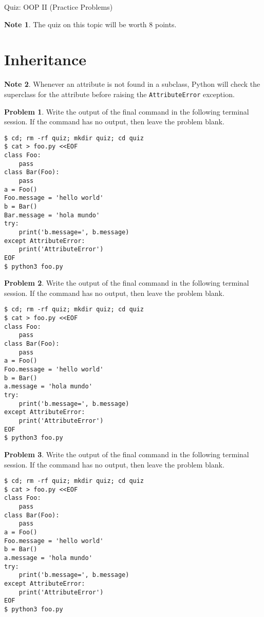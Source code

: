 \documentclass[10pt]{article}
\theoremstyle{definition}
\newtheorem{problem}{Problem}
\newtheorem{note}{Note}
\begin{document}
\begin{center}
    {
\Large
    Quiz: OOP II (Practice Problems)
}

    \vspace{0.1in}
\end{center}

\begin{note}
    The quiz on this topic will be worth 8 points.
\end{note}

\filbreak
\section{Inheritance}

\begin{note}
    Whenever an attribute is not found in a subclass,
    Python will check the superclass for the attribute before raising the \lstinline{AttributeError} exception.
\end{note}

\filbreak
\begin{problem}
    Write the output of the final command in the following terminal session.
    If the command has no output, then leave the problem blank.
\end{problem}
\begin{lstlisting}
$ cd; rm -rf quiz; mkdir quiz; cd quiz
$ cat > foo.py <<EOF
class Foo:
    pass
class Bar(Foo):
    pass
a = Foo()
Foo.message = 'hello world'
b = Bar()
Bar.message = 'hola mundo'
try:
    print('b.message=', b.message)
except AttributeError:
    print('AttributeError') 
EOF
$ python3 foo.py
\end{lstlisting}


\filbreak
\begin{problem}
    Write the output of the final command in the following terminal session.
    If the command has no output, then leave the problem blank.
\end{problem}
\begin{lstlisting}
$ cd; rm -rf quiz; mkdir quiz; cd quiz
$ cat > foo.py <<EOF
class Foo:
    pass
class Bar(Foo):
    pass
a = Foo()
Foo.message = 'hello world'
b = Bar()
a.message = 'hola mundo'
try:
    print('b.message=', b.message)
except AttributeError:
    print('AttributeError') 
EOF
$ python3 foo.py
\end{lstlisting}


\filbreak
\begin{problem}
    Write the output of the final command in the following terminal session.
    If the command has no output, then leave the problem blank.
\end{problem}
\begin{lstlisting}
$ cd; rm -rf quiz; mkdir quiz; cd quiz
$ cat > foo.py <<EOF
class Foo:
    pass
class Bar(Foo):
    pass
a = Foo()
Foo.message = 'hello world'
b = Bar()
a.message = 'hola mundo'
try:
    print('b.message=', b.message)
except AttributeError:
    print('AttributeError') 
EOF
$ python3 foo.py
\end{lstlisting}
\end{document}
